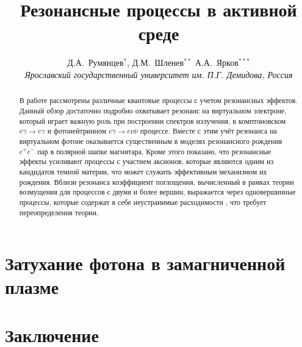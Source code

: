\documentclass[12pt]{article}
\title{Резонансные процессы в активной среде}
\author{Д.А.~Румянцев$^{*}$, Д.М.~Шленев$^{**}$
А.А.~Ярков$^{***}$
\\
{\it Ярославский государственный университет им. П.Г. Демидова, Россия}}
\date{}
\begin{document}
\large
\maketitle
\def\abstractname{\empty}
\baselineskip=22pt

\begin{abstract}

\baselineskip=20pt

В работе рассмотрены различные квантовые процессы с учетом резонансных эффектов. Данный обзор достаточно подробно охватывает резонанс на виртуальном электроне, который играет важную роль при построении спектров излучения, в комптоновском $e\gamma \to e \gamma$ и фотонейтринном $e\gamma\to e \nu \overline{\nu}$ процессе. Вместе с этим учёт резонанса на виртуальном фотоне оказывается существенным в моделях резонансного  рождения $e^+e^-$ пар в полярной шапке магнитара. Кроме этого показано, что резонансные эффекты усиливают процессы с участием аксионов, которые являются одним из кандидатов темной материи, что может служить эффективным механизмом их рождения. Вблизи резонанса коэффициент поглощения, вычисленный в рамках теории возмущения для процессов с двумя и более вершин, выражается через одновершинные процессы, которые содержат в себе неустранимые расходимости , что требует переопределения теории.
\end{abstract}

{\def\thefootnote{*}
\def\thefootnote{**}
\def\thefootnote{***}
}

\newpage
\unitlength 1mm




\label{Ch:WaveF}
\label{Ch:Propagator}

\label{Ch:Compton}




\section{Затухание фотона в замагниченной плазме}\label{Ch:DampPhot}

\section{Заключение}

\newpage
%


\end{document}
